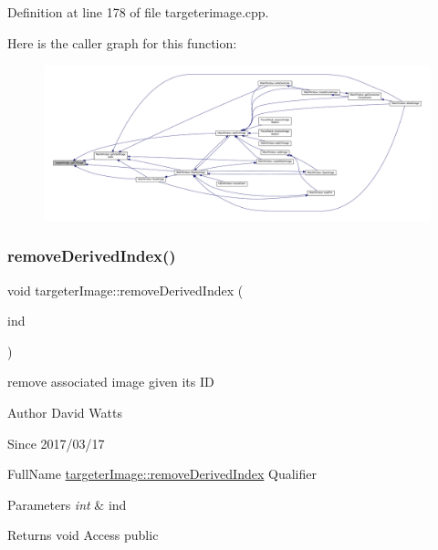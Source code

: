 Definition at line 178 of file targeterimage.\+cpp.

Here is the caller graph for this function\+:
\nopagebreak
\begin{figure}[H]
\begin{center}
\leavevmode
\includegraphics[width=350pt]{classtargeter_image_a9c5c783a82afecd73a0b877d3bfdfc01_icgraph}
\end{center}
\end{figure}
\mbox{\label{classtargeter_image_ac18fa800316f0d23610318ccf1b35bfc}} 
\subsubsection{\texorpdfstring{remove\+Derived\+Index()}{removeDerivedIndex()}}
{\footnotesize\ttfamily void targeter\+Image\+::remove\+Derived\+Index (\begin{DoxyParamCaption}\item[{int}]{ind }\end{DoxyParamCaption})}

remove associated image given its ID

\begin{DoxyAuthor}{Author}
David Watts 
\end{DoxyAuthor}
\begin{DoxySince}{Since}
2017/03/17
\end{DoxySince}
Full\+Name \hyperlink{classtargeter_image_ac18fa800316f0d23610318ccf1b35bfc}{targeter\+Image\+::remove\+Derived\+Index} Qualifier 
\begin{DoxyParams}{Parameters}
{\em int} & ind \\
\hline
\end{DoxyParams}
\begin{DoxyReturn}{Returns}
void Access public 
\end{DoxyReturn}


